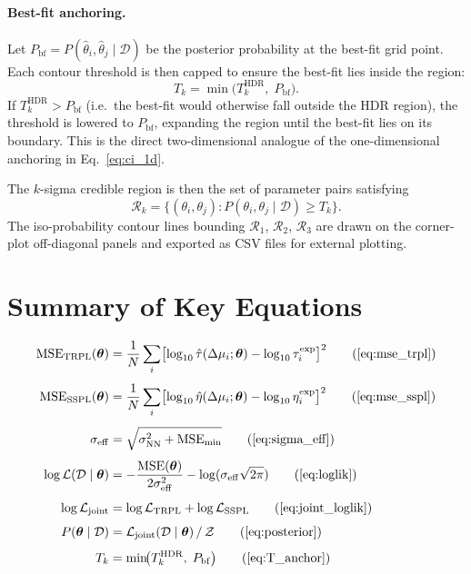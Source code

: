 \documentclass[a4paper,11pt]{article}
\newcommand{\btheta}{\boldsymbol{\theta}}
\newcommand{\MSE}{\mathrm{MSE}}
\newcommand{\TRPL}{\mathrm{TRPL}}
\newcommand{\SSPL}{\mathrm{SSPL}}
\newcommand{\effNN}{\mathrm{eff}}
\newcommand{\NN}{\mathrm{NN}}
\newcommand{\logten}{\log_{10}}
\begin{document}
\paragraph{Best-fit anchoring.}
Let $P_\mathrm{bf} = P(\hat\theta_i, \hat\theta_j\mid\mathcal{D})$ be the
posterior probability at the best-fit grid point. Each contour threshold is
then capped to ensure the best-fit lies inside the region:
\begin{equation}
  T_k = \min\bigl(T_k^\mathrm{HDR},\; P_\mathrm{bf}\bigr).
  \label{eq:T_anchor}
\end{equation}
If $T_k^\mathrm{HDR} > P_\mathrm{bf}$ (i.e.\ the best-fit would otherwise
fall outside the HDR region), the threshold is lowered to $P_\mathrm{bf}$,
expanding the region until the best-fit lies on its boundary. This is the
direct two-dimensional analogue of the one-dimensional anchoring in
Eq.~\eqref{eq:ci_1d}.

The $k$-sigma credible region is then the set of parameter pairs satisfying
\begin{equation}
  \mathcal{R}_k = \bigl\{(\theta_i,\theta_j)
                  : P(\theta_i,\theta_j\mid\mathcal{D}) \ge T_k\bigr\}.
\end{equation}
The iso-probability contour lines bounding $\mathcal{R}_1$, $\mathcal{R}_2$,
$\mathcal{R}_3$ are drawn on the corner-plot off-diagonal panels and exported
as CSV files for external plotting.

\section{Summary of Key Equations}

\begin{align}
  \MSE_\TRPL(\btheta)
  &= \frac{1}{N}\sum_i\bigl[\logten\hat\tau(\Delta\mu_i;\btheta)
     - \logten\tau_i^\mathrm{exp}\bigr]^2
  \tag{\ref{eq:mse_trpl}} \\[4pt]
  \MSE_\SSPL(\btheta)
  &= \frac{1}{N}\sum_i\bigl[\logten\hat\eta(\Delta\mu_i;\btheta)
     - \logten\eta_i^\mathrm{exp}\bigr]^2
  \tag{\ref{eq:mse_sspl}} \\[4pt]
  \sigma_\effNN
  &= \sqrt{\sigma_\NN^2 + \MSE_\mathrm{min}}
  \tag{\ref{eq:sigma_eff}} \\[4pt]
  \log\mathcal{L}(\mathcal{D}\mid\btheta)
  &= -\frac{\MSE(\btheta)}{2\sigma_\effNN^2}
     - \log(\sigma_\effNN\sqrt{2\pi})
  \tag{\ref{eq:loglik}} \\[4pt]
  \log\mathcal{L}_\mathrm{joint}
  &= \log\mathcal{L}_\TRPL + \log\mathcal{L}_\SSPL
  \tag{\ref{eq:joint_loglik}} \\[4pt]
  P(\btheta\mid\mathcal{D})
  &= \mathcal{L}_\mathrm{joint}(\mathcal{D}\mid\btheta) \,/\, \mathcal{Z}
  \tag{\ref{eq:posterior}} \\[4pt]
  T_k
  &= \min\!\bigl(T_k^\mathrm{HDR},\; P_\mathrm{bf}\bigr)
  \tag{\ref{eq:T_anchor}}
\end{align}
\end{document}
